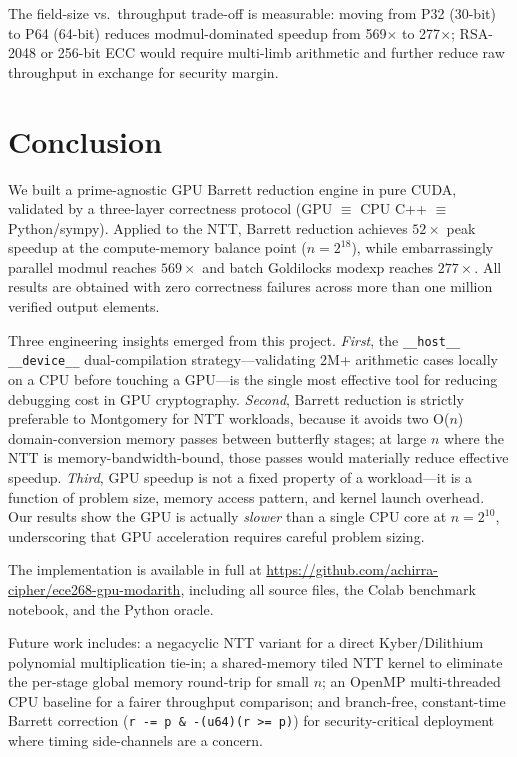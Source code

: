 \documentclass[conference]{IEEEtran}
\begin{document}
The field-size vs.\ throughput trade-off is measurable: moving from P32 (30-bit)
to P64 (64-bit) reduces modmul-dominated speedup from 569$\times$ to 277$\times$;
RSA-2048 or 256-bit ECC would require multi-limb arithmetic and further reduce
raw throughput in exchange for security margin.

\section{Conclusion}

We built a prime-agnostic GPU Barrett reduction engine in pure CUDA, validated
by a three-layer correctness protocol (GPU $\equiv$ CPU C++ $\equiv$
Python/sympy). Applied to the NTT, Barrett reduction achieves $52\times$ peak
speedup at the compute-memory balance point ($n=2^{18}$), while embarrassingly
parallel modmul reaches $569\times$ and batch Goldilocks modexp reaches
$277\times$. All results are obtained with zero correctness failures across
more than one million verified output elements.

Three engineering insights emerged from this project. \emph{First}, the
\texttt{\_\_host\_\_ \_\_device\_\_} dual-compilation strategy---validating 2M+
arithmetic cases locally on a CPU before touching a GPU---is the single most
effective tool for reducing debugging cost in GPU cryptography. \emph{Second},
Barrett reduction is strictly preferable to Montgomery for NTT workloads, because
it avoids two O($n$) domain-conversion memory passes between butterfly stages;
at large $n$ where the NTT is memory-bandwidth-bound, those passes would
materially reduce effective speedup. \emph{Third}, GPU speedup is not a fixed
property of a workload---it is a function of problem size, memory access pattern,
and kernel launch overhead. Our results show the GPU is actually \emph{slower}
than a single CPU core at $n=2^{10}$, underscoring that GPU acceleration requires
careful problem sizing.

The implementation is available in full at
\url{https://github.com/achirra-cipher/ece268-gpu-modarith}, including all source
files, the Colab benchmark notebook, and the Python oracle.

Future work includes: a negacyclic NTT variant for a direct Kyber/Dilithium
polynomial multiplication tie-in; a shared-memory tiled NTT kernel to eliminate
the per-stage global memory round-trip for small $n$; an OpenMP multi-threaded
CPU baseline for a fairer throughput comparison; and branch-free, constant-time
Barrett correction (\texttt{r -= p \& -(u64)(r >= p)}) for security-critical
deployment where timing side-channels are a concern.
\end{document}
